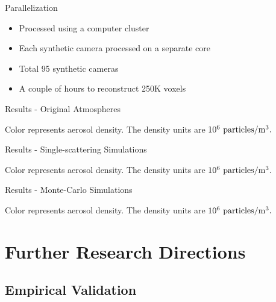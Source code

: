 \documentclass[compress,red,12pt]{beamer}
\begin{document}

\begin{frame}{Parallelization}
  \begin{itemize}
  \item Processed using a computer cluster
  \item Each synthetic camera processed on a separate core
  \item Total 95 synthetic cameras
  \item A couple of hours to reconstruct 250K voxels
  \end{itemize}
\end{frame}


\begin{frame}{Results - Original Atmospheres}
  \centerline{\def\svgwidth{1.15\linewidth}\footnotesize{}}
  \centerline{\footnotesize Color represents aerosol density. The
    density units are $10^{6}~{\rm particles}/{\rm m}^3.$}
\end{frame}


\begin{frame}{Results - Single-scattering Simulations}
  \centerline{\def\svgwidth{1.15\linewidth}\footnotesize{}}
  \centerline{\footnotesize Color represents aerosol density. The
    density units are $10^{6}~{\rm particles}/{\rm m}^3.$}
\end{frame}


\begin{frame}{Results - Monte-Carlo Simulations}
  \centerline{\def\svgwidth{1.15\linewidth}\footnotesize{}}
  \centerline{\footnotesize Color represents aerosol density. The
    density units are $10^{6}~{\rm particles}/{\rm m}^3.$}
\end{frame}


\section{Further Research Directions}

\subsection{Empirical Validation}
\end{document}
